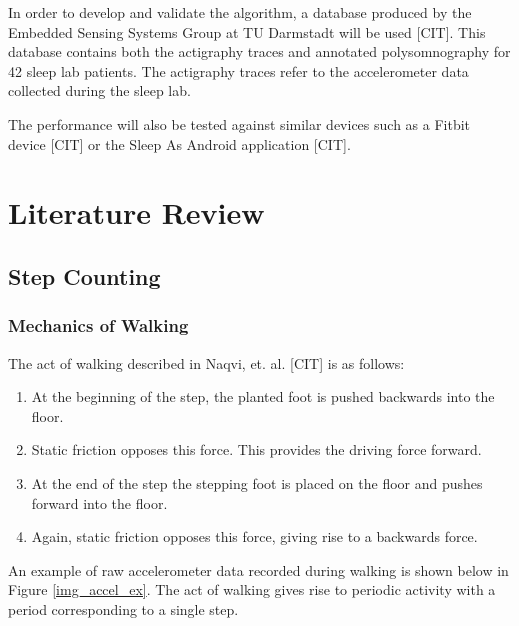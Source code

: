             In order to develop and validate the algorithm, a database produced by the Embedded Sensing Systems Group at TU Darmstadt will be used [CIT]. This database contains both the actigraphy traces and annotated polysomnography for 42 sleep lab patients. The actigraphy traces refer to the accelerometer data collected during the sleep lab.

            The performance will also be tested against similar devices such as a Fitbit device [CIT] or the Sleep As Android application [CIT]. 


    \chapter{Literature Review}


        \section{Step Counting}

            \subsection{Mechanics of Walking}

                The act of walking described in Naqvi, et. al. [CIT] is as follows:

                \begin{enumerate}
                    \item At the beginning of the step, the planted foot is pushed backwards into the floor.
                    \item Static friction opposes this force. This provides the driving force forward.
                    \item At the end of the step the stepping foot is placed on the floor and pushes forward into the floor.
                    \item Again, static friction opposes this force, giving rise to a backwards force.
                \end{enumerate}

                An example of raw accelerometer data recorded during walking is shown below in Figure \ref{img_accel_ex}. The act of walking gives rise to periodic activity with a period corresponding to a single step. 

